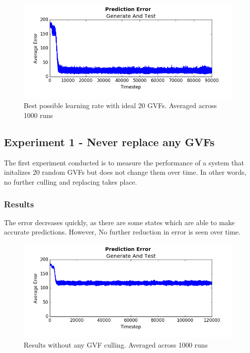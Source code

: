 \documentclass[letterpaper]{article}
\begin{document}
\begin{figure}[H]
  \centerline{\includegraphics[width = \linewidth]{Plots/AverageErrorBestPossibleWith20RealGVFS.png}}
  \caption{Best possible learning rate with ideal 20 GVFs. Averaged across 1000 runs}
  \label{fig:ideal}
\end{figure}

\subsection{Experiment 1 - Never replace any GVFs}
The first experiment conducted is to measure the performance of a system that initalizes 20 random GVFs but does not change them over time. In other words, no further culling and replacing takes place.  

\subsubsection{Results}

The error decreases quickly, as there are some states which are able to make accurate predictions. However, No further reduction in error is seen over time. 

\begin{figure}[H]
  \centerline{\includegraphics[width = \linewidth]{Plots/AverageErrorNoKulling.png}}
  \caption{Results without any GVF culling. Averaged across 1000 runs}
  \label{fig:experiment}
\end{figure}
\end{document}
